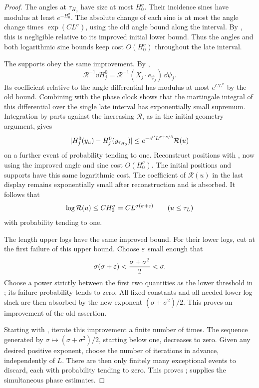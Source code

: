 \begin{proof}
The angles at \(\tau_{H_0}\) have size at most \(H_0^\sigma\).
Their incidence sines have modulus at least \(e^{-H_0^\sigma}\).
The absolute change of each sine is at most the angle change times
\(\exp(CL^\sigma)\), using the old angle bound along the interval.
By , this is negligible relative to its
improved initial lower bound.  Thus the angles and both logarithmic sine
bounds keep cost \(O(H_0^\sigma)\) throughout the late interval.

The supports obey the same improvement.  By
,
\[
 \mathcal R^{-1}\dd H_j^0
    =\mathcal R^{-1}(X_j\cdot e_{\psi_j})\,\dd\psi_j.
\]
Its coefficient relative to the angle differential has modulus at most
\(e^{CL^\sigma}\) by the old bound.  Combining
 with the phase clock shows that the
martingale integral of this differential over the single late interval
has exponentially small supremum.  Integration by parts against the
increasing \(\mathcal R\), as in the initial geometry argument, gives
\[
 |H_j^0(y_u)-H_j^0(y_{\tau_{H_0}})|
    \le e^{-c''L^{\sigma+\varepsilon/3}}\mathcal R(u)
\]
on a further event of probability tending to one.  Reconstruct positions
with , now using the improved angle and sine cost
\(O(H_0^\sigma)\).  The initial positions and supports have this same
logarithmic cost.  The coefficient of \(\mathcal R(u)\) in the last
display remains exponentially small after reconstruction and is absorbed.
It follows that
\[
 \log\mathcal R(u)\le C H_0^\sigma
       =C L^{\sigma(\sigma+\varepsilon)}
       \qquad(u\le\tau_L)
\]
with probability tending to one.

The length upper logs have the same improved bound.  For their lower logs,
cut at the first failure of this upper bound. Choose \(\varepsilon\) small
enough that
\[
\sigma(\sigma+\varepsilon)<\frac{\sigma+\sigma^2}{2}<\sigma.
\]
Choose a power strictly between the first two quantities as the lower
threshold in ; its failure probability tends to zero.
All fixed constants and all needed lower-log slack are then absorbed by
the new exponent \((\sigma+\sigma^2)/2\).  This proves an improvement of
the old assertion.

Starting with , iterate this improvement a
finite number of times.  The sequence generated by
\(\sigma\mapsto(\sigma+\sigma^2)/2\), starting below one, decreases to
zero.  Given any desired positive exponent, choose the number of iterations
in advance, independently of \(L\).  There are then only finitely many
exceptional events to discard, each with probability tending to zero.
This proves ;
 supplies the simultaneous phase estimates.
\end{proof}
